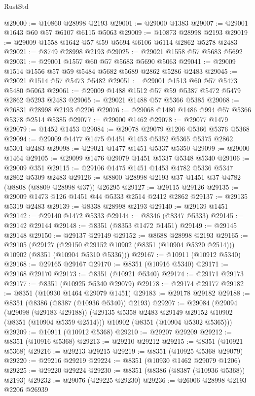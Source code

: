 \begin{lexlean}{RustStd}
\begin{coremodule}
@29000 := @10860 @28998 @2193
@29001 := @29000 @1383
@29007 := @29001 @1643 @60 @57 @6107 @6115 @5063
@29009 := @10873 @28998 @2193
@29019 := @29009 @1558 @1642 @57 @59 @5694 @6106 @6114 @2862 @5278 @2483
@29021 := @8749 @28998 @2193
@29025 := @29021 @1558 @57 @5683 @5692
@29031 := @29001 @1557 @60 @57 @5683 @5690 @5063
@29041 := @29009 @1514 @1556 @57 @59 @5484 @5682 @5689 @2862 @5286 @2483
@29045 := @29021 @1514 @57 @5473 @5482
@29051 := @29001 @1513 @60 @57 @5473 @5480 @5063
@29061 := @29009 @1488 @1512 @57 @59 @5387 @5472 @5479 @2862 @5293 @2483
@29065 := @29021 @1488 @57 @5366 @5385
@29068 := @26831 @28998 @2193 @2206
@29076 := @29068 @1480 @1486 @994 @57 @5366 @5378 @2514 @5385
@29077 := @29000 @1462
@29078 := @29077 @1479
@29079 := @1452 @1453
@29084 := @29078 @29079 @1206 @5366 @5376 @5368
@29094 := @29009 @1477 @1475 @1451 @1453 @5352 @5365 @5375 @2862 @5301 @2483
@29098 := @29021 @1477 @1451 @5337 @5350
@29099 := @29000 @1464
@29105 := @29099 @1476 @29079 @1451 @5337 @5348 @5340
@29106 := @29009 @351
@29115 := @29106 @1475 @1451 @1453 @4782 @5336 @5347 @2862 @5309 @2483
@29126 := @8800 @28998 @2193 @37 @1451 @37 @4782 (@8808 (@8809 @28998 @37)) @26295
@29127 := @29115 @29126
@29135 := @29009 @1473 @126 @1451 @44 @5333 @2514 @2412 @2862
@29137 := @29135 @5319 @2483
@29139 := @8338 @28998 @2193
@29140 := @29139 @1451
@29142 := @29140 @1472 @5333
@29144 := @8346 (@8347 @5333)
@29145 := @29142 @29144
@29148 := @8351 (@8353 @1472 @1451)
@29149 := @29145 @29148
@29150 := @29137 @29149
@29152 := @8688 @28998 @2193
@29165 := @29105
    (@29127 (@29150 @29152 @10902 (@8351 (@10904 @5320 @2514))) @10902 (@8351 (@10904 @5310 @5336)))
@29167 := @10911 (@10912 @5340)
@29168 := @29165 @29167
@29170 := @8351 (@10916 @5340)
@29171 := @29168 @29170
@29173 := @8351 (@10921 @5340)
@29174 := @29171 @29173
@29177 := @8351 (@10925 @5340 @29079)
@29178 := @29174 @29177
@29182 := @8351 (@10930 @1464 @29079 @1451)
@29183 := @29178 @29182
@29188 := @8351 (@8386 (@8387 (@10936 @5340)) @2193)
@29207 := @29084
    (@29094
      (@29098 (@29183 @29188))
      (@29135 @5358 @2483 @29149 @29152 @10902 (@8351 (@10904 @5359 @2514)))
      @10902
      (@8351 (@10904 @5302 @5365)))
@29209 := @10911 (@10912 @5368)
@29210 := @29207 @29209
@29212 := @8351 (@10916 @5368)
@29213 := @29210 @29212
@29215 := @8351 (@10921 @5368)
@29216 := @29213 @29215
@29219 := @8351 (@10925 @5368 @29079)
@29220 := @29216 @29219
@29224 := @8351 (@10930 @1462 @29079 @1206)
@29225 := @29220 @29224
@29230 := @8351 (@8386 (@8387 (@10936 @5368)) @2193)
@29232 := @29076 (@29225 @29230)
@29236 := @26006 @28998 @2193 @2206 @26939

\end{coremodule}
\end{lexlean}
